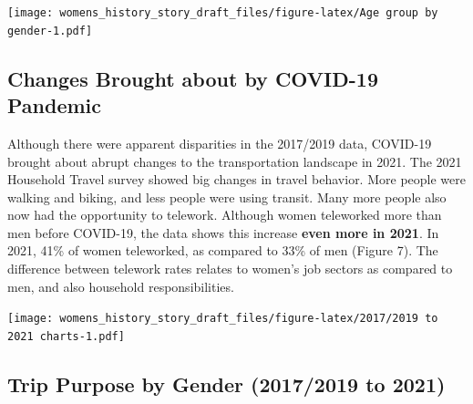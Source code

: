 \documentclass[
  12pt,
]{article}
\begin{document}
\texttt{[image: womens\_history\_story\_draft\_files/figure-latex/Age group by gender-1.pdf]}

\newpage
\setlength{\headheight}{10pt}
\setlength{\textheight}{665pt}
\fancyhead[L]{}

\hypertarget{changes-brought-about-by-covid-19-pandemic}{%
\subsection{Changes Brought about by COVID-19
Pandemic}\label{changes-brought-about-by-covid-19-pandemic}}

\begin{flushleft}
Although there were apparent disparities in the 2017/2019 data, COVID-19 brought about abrupt changes to the transportation landscape in 2021. The 2021 Household Travel survey showed big changes in travel behavior. More people were walking and biking, and less people were using transit. Many more people also now had the opportunity to telework. Although women teleworked more than men before COVID-19, the data shows this increase \textbf{even more in 2021}. In 2021, 41\% of women teleworked, as compared to 33\% of men (Figure 7). The difference between telework rates relates to women's job sectors as compared to men, and also household responsibilities.
\end{flushleft}

\texttt{[image: womens\_history\_story\_draft\_files/figure-latex/2017/2019 to 2021 charts-1.pdf]}

\hypertarget{trip-purpose-by-gender-20172019-to-2021}{%
\subsection{Trip Purpose by Gender (2017/2019 to
2021)}\label{trip-purpose-by-gender-20172019-to-2021}}

\end{document}
